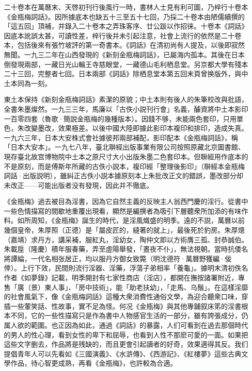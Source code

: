 二十卷本在萬曆末、天啓初刊行後風行一時，書林人士見有利可圖，乃梓行十卷本《金瓶梅詞話》。因所據底本也缺五十三至五十七回，乃採二十卷本由陋儒續撰的「這五回」頂補，并錄入二十卷本之弄珠客序、廿公跋以作招徕。十卷本《詞話》因底本訛誤太甚，可讀性差，梓行後并未引起注意，社會上流行的依然是二十卷本，包括後來有張竹坡評的第一奇書本。《詞話》在清初尚有人提及，以後即寂然無聞。一九三二年在山西發現的《新刻金瓶梅詞話》，已屬海内孤本。其後在日本倒發現兩部，一藏日光山輪王寺慈眼堂，一藏德山毛利栖息堂。另京都大學有殘本二十三回，完整者七回。日本兩部《詞話》除栖息堂本第五回末頁曾换版外，與中土本同為一刻。

東土本保持《新刻金瓶梅詞話》素潔的原貌；中土本則有後人的朱筆校改與批語，全書朱墨燦然。一九三三年，馬廉以「古佚小説刊行會」名義，醵資將中土本影印一百零四套{\innerzhushi（魯歌·簡説金瓶梅的幾種版本）}。因錢不够，未能兩色套印，只用單色，朱改變墨改，效果極差。以後中國大陸即據此影印本複印和排印，造成失真。一九六三年，日本大安株式會社據彼邦兩部補配，影印配本《金瓶梅詞話》，稱「日本大安本」。一九七八年，臺北聨經出版事業有限公司按照原藏北京圖書館、現存臺北故宫博物院中土本之原尺寸大小出版朱墨二色套印本。但聨經用作底本的不是原刻，而是傅斯年所藏的古佚小説本，複印經「整理後影印」{\innerzhushi（聨經本金瓶梅詞話·出版説明）}，雖糾正古佚小説本據原刻本上朱批改正文的錯誤，墨改部分却未改正——可能出版者没有發現，因此并不徹底。

《金瓶梅》過去被目為淫書，因為它自然主義的反映主人翁西門慶的淫行。從書中一些色情描寫的間歇地重覆出現看，顯然是編撰者為吸引下層聽衆所加添的有味作料。如所周知，《金瓶梅》誕生的時代，是淫風熾盛的明季。遠的不説，萬曆以前幾個皇帝，朱厚照（正德）是「屬皮匠的，縫著的就上」，最後死於豹房。朱厚熜（嘉靖）求丹方，講采補，服紅丸，淫幼女，陶仲文即以方術膺三孤、封恭誠伯。朱載垕（隆慶）積年服春藥，弄至虛陽舉發，「晝夜不仆」，無法視朝。當時抗倭名將譚綸，一代名相张居正，均以服丹方御女致斃{\innerzhushi（明沈德符·萬曆野獲編·佞倖）}。上行下效，民間則流行淫器、淫藥，浮蕩子弟相率「養龜」。據明末清初佚名作者《如夢錄》記載，明季開封有七家性商店（淫店），都開在撫按諸署附近，專售「廣（景）東人事」、「房中技術」，能「助老扶幼」，「走馬、乌鬚」。在這樣淫靡的社會風氣下，像《金瓶梅詞話》這種大衆消費性通俗文學，為迎合聽衆口味，穿插一些葷笑話、性故事，實不足為怪。何况《金瓶梅》與其他專鋪叙床笫的淫書根本不同，它的一些性描寫只是作為書中人物感官生活的一部分，雖有誇張成分，仍属人欲的範圍。也正因為如此，通過《詞話》的暴露，人们可看到在過去那個時代的男人的性心理，看到女性的卑下和屈辱，也看到人性不那麽可愛的一面。如果把這些文字删去，作品將是残缺的，而且更會引起讀者的好奇，效果適得其反。我们提倡青年人可以先看如《三國演義》、《水滸傳》、《西游記》、《紅樓夢》這些古典文學作品，待心智更成熟，再看《金瓶梅》，也許較為合適。

